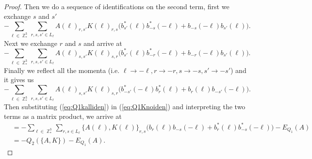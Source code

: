 \documentclass[sn-mathphys, Numbered ,a4paper]{sn-jnl}%
\DeclareMathOperator{\Z}{\mathbb{Z}}
\theoremstyle{plain}
\theoremstyle{definition}
\theoremstyle{remark}
\theoremstyle{plain}
\theoremstyle{definition}
\theoremstyle{remark}
\begin{document}
\begin{proof}
Then we do a sequence of identifications on the second term, first we exchange $s$ and $s'$ 
\begin{equation}
    -\sum\limits_{\ell \in \Z^3_*}\sum\limits_{r,s,s' \in L_{\ell}}A(\ell)_{r,s'}K(\ell)_{r,s}\big(b^*_{s'}(\ell)b^*_{-s}(-\ell)+b_{-s}(-\ell)b_{s'}(\ell) \big).
\end{equation}
Next we exchange $r$ and $s$ and arrive at
\begin{equation}
    -\sum\limits_{\ell \in \Z^3_*}\sum\limits_{r,s,s' \in L_{\ell}}A(\ell)_{s,s'}K(\ell)_{s,r}\big(b^*_{s'}(\ell)b^*_{-r}(-\ell) +b_{-r}(-\ell)b_{s'}(\ell)\big).
\end{equation}
Finally we reflect all the momenta (i.e. $\ell\rightarrow -\ell,r\rightarrow -r,s\rightarrow -s,s'\rightarrow -s'$) and it gives us
\begin{equation}\label{eq:Q1kalliden}
    -\sum\limits_{\ell \in \Z^3_*}\sum\limits_{r,s,s' \in L_{\ell}}A(\ell)_{s,s'}K(\ell)_{s,r}\big(b^*_{-s'}(-\ell)b^*_{r}(\ell) +b_{r}(\ell)b_{-s'}(-\ell)\big).
\end{equation}
Then substituting (\ref{eq:Q1kalliden}) in (\ref{eq:Q1Knoiden}) and interpreting the two terms as a matrix product, we arrive at
\begin{align}
     [ Q_1(A),\mathcal{K}]  &= -\sum\limits_{\ell \in \Z^3_*}\sum\limits_{r,s \in L_{\ell}}\big\{A(\ell), K(\ell)\big\}_{r,s}\big(b_{r}(\ell)b_{-s}(-\ell)+b^*_{r}(\ell)b^*_{-s}(-\ell)  \big) - E_{Q_1}(A)\\
    &= -Q_2\left(\big\{A, K\big\}\right) - E_{Q_1}(A).
\end{align}
\end{proof}
\end{document}
